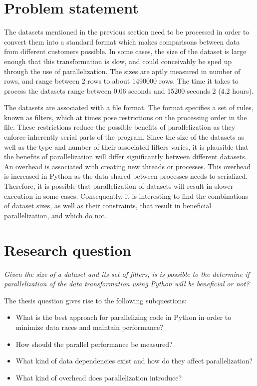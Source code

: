 \section{Problem statement}
The datasets mentioned in the previous section need to be processed in order to convert them into a standard format
which makes comparisons between data from different customers possible. 
In some cases, the size of the dataset is large enough that this transformation is slow, and could conceivably be sped up through
the use of parallelization.  The sizes are aptly measured in number of rows, and range between 2 rows to about 1490000 rows. The time
it takes to process the datasets range between 0.06 seconds and 15200 seconds 2 (4.2 hours).

The datasets are associated with a file format. The format specifies a set of rules, known as filters, which at times pose restrictions on the processing order in the file.
These restrictions reduce the possible benefits of parallelization as they enforce inherently serial parts of the program. Since the size of the datasets as
well as the type and number of their associated filters varies, it is plausible that the benefits of parallelization will differ significantly between
different datasets. An overhead is associated with creating new threads or processes. This overhead is increased in Python as the data shared
between processes needs to serialized. Therefore, it is possible that parallelization of datasets will result in slower execution in some cases.
Consequently, it is interesting to find the combinations of dataset sizes, as well as their constraints, that result in beneficial parallelization,
and which do not.

\section{Research question}
\emph{Given the size of a dataset and its set of filters, is is possible to the determine 
if parallelization of the data transformation using Python will be beneficial or not?}

The thesis question gives rise to the following subquestions:
\begin{itemize}
    \item What is the best approach for parallelizing code in Python in order to minimize data races and maintain performance?
    \item How should the parallel performance be measured?
    \item What kind of data dependencies exist and how do they affect parallelization?
    \item What kind of overhead does parallelization introduce?
\end{itemize}


